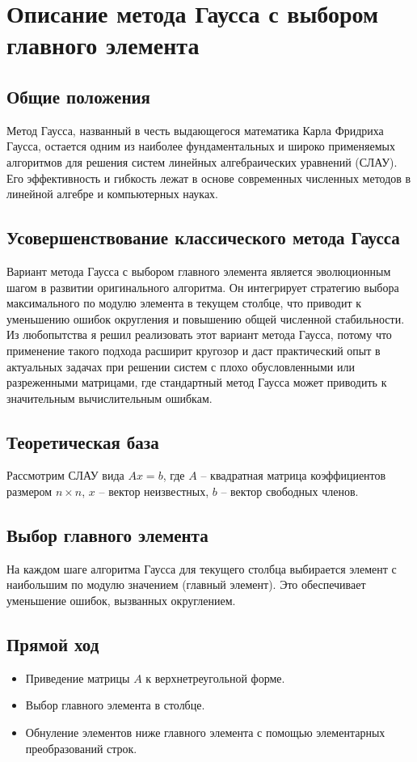 \section{Описание метода Гаусса с выбором главного элемента}

\subsection{Общие положения}
Метод Гаусса, названный в честь выдающегося математика Карла Фридриха Гаусса, остается одним из наиболее фундаментальных и широко применяемых алгоритмов для решения систем линейных алгебраических уравнений (СЛАУ). Его эффективность и гибкость лежат в основе современных численных методов в линейной алгебре и компьютерных науках.

\subsection{Усовершенствование классического метода Гаусса}
Вариант метода Гаусса с выбором главного элемента является эволюционным шагом в развитии оригинального алгоритма. Он интегрирует стратегию выбора максимального по модулю элемента в текущем столбце, что приводит к уменьшению ошибок округления и повышению общей численной стабильности. Из любопытства я решил реализовать этот вариант метода Гаусса, потому что применение такого подхода расширит кругозор и даст практический опыт в актуальных задачах при решении систем с плохо обусловленными или разреженными матрицами, где стандартный метод Гаусса может приводить к значительным вычислительным ошибкам.

\subsection{Теоретическая база}
Рассмотрим СЛАУ вида \(Ax = b\), где \(A\) -- квадратная матрица коэффициентов размером \(n \times n\), \(x\) -- вектор неизвестных, \(b\) -- вектор свободных членов.

\subsection{Выбор главного элемента}
На каждом шаге алгоритма Гаусса для текущего столбца выбирается элемент с наибольшим по модулю значением (главный элемент). Это обеспечивает уменьшение ошибок, вызванных округлением.

\subsection{Прямой ход}
\begin{itemize}
  \item Приведение матрицы \(A\) к верхнетреугольной форме.
  \item Выбор главного элемента в столбце.
  \item Обнуление элементов ниже главного элемента с помощью элементарных преобразований строк.
\end{itemize}

